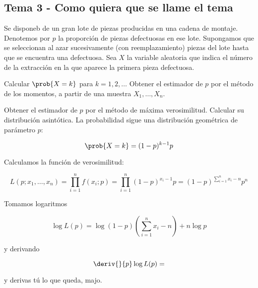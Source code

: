 \subsection{Tema 3 - Como quiera que se llame el tema}

\begin{problem}[3] Se disponeb de un gran lote de piezas producidas en una cadena de montaje. Denotemos por $p$ la proporción de piezas defectuosas en ese lote. Supongamos que se seleccionan al azar sucesivamente (con reemplazamiento) piezas del lote hasta que se encuentra una defectuosa. Sea $X$ la variable aleatoria que indica el número de la extracción en la que aparece la primera pieza defectuosa.

\ppart Calcular $\prob{X=k}$ para $k=1,2,\dotsc$ Obtener el estimador de $p$ por el método de los momentos, a partir de una muestra $X_1,\dotsc , X_n$.

\ppart Obtener el estimador de $p$ por el método de máxima verosimilitud. Calcular su distribución asintótica.
\solution
\spart
La probabilidad sigue una distribución geométrica de parámetro $p$:

\[ \prob{X=k} = (1-p)^{k-1}p \]

\spart Calculamos la función de verosimilitud:

\[ L(p;x_1,\dotsc,x_n) = \prod_{i=1}^n f(x_i;p) = \prod_{i=1}^n (1-p)^{x_i -1}p = (1-p)^{\sum_{i=1}^n x_i -n} p^n \]

Tomamos logaritmos

\[ \log L(p) = \log(1-p) \left(\sum_{i=1}^n x_i -n\right) + n\log p \]

y derivando

\[ \deriv{}{p} \log L(p) = \]

y derivas tú lo que queda, majo.
\end{problem}

